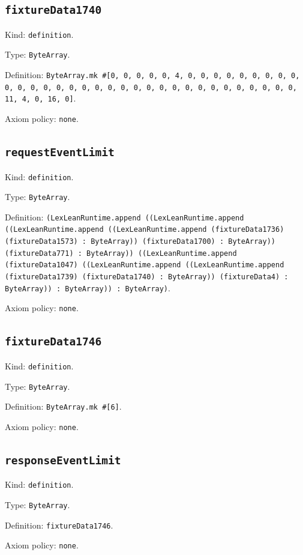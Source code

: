 \documentclass[11pt]{article}
\begin{document}
\subsection*{\texttt{fixtureData1740}}
\noindent Kind: \texttt{definition}.\par
\noindent Type: \texttt{ByteArray}.\par
\noindent Definition: \texttt{ByteArray.mk \#[0, 0, 0, 0, 0, 4, 0, 0, 0, 0, 0, 0, 0, 0, 0, 0, 0, 0, 0, 0, 0, 0, 0, 0, 0, 0, 0, 0, 0, 0, 0, 0, 0, 0, 0, 0, 0, 0, 11, 4, 0, 16, 0]}.\par
\noindent Axiom policy: \texttt{none}.\par
\subsection*{\texttt{requestEventLimit}}
\noindent Kind: \texttt{definition}.\par
\noindent Type: \texttt{ByteArray}.\par
\noindent Definition: \texttt{(LexLeanRuntime.append ((LexLeanRuntime.append ((LexLeanRuntime.append ((LexLeanRuntime.append (fixtureData1736) (fixtureData1573) : ByteArray)) (fixtureData1700) : ByteArray)) (fixtureData771) : ByteArray)) ((LexLeanRuntime.append (fixtureData1047) ((LexLeanRuntime.append ((LexLeanRuntime.append (fixtureData1739) (fixtureData1740) : ByteArray)) (fixtureData4) : ByteArray)) : ByteArray)) : ByteArray)}.\par
\noindent Axiom policy: \texttt{none}.\par
\subsection*{\texttt{fixtureData1746}}
\noindent Kind: \texttt{definition}.\par
\noindent Type: \texttt{ByteArray}.\par
\noindent Definition: \texttt{ByteArray.mk \#[6]}.\par
\noindent Axiom policy: \texttt{none}.\par
\subsection*{\texttt{responseEventLimit}}
\noindent Kind: \texttt{definition}.\par
\noindent Type: \texttt{ByteArray}.\par
\noindent Definition: \texttt{fixtureData1746}.\par
\noindent Axiom policy: \texttt{none}.\par
\end{document}
